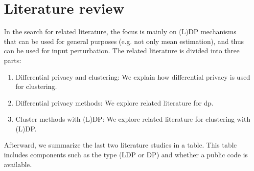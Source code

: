 \section{Literature review} \label{theory:literature-review}
In the search for related literature, the focus is mainly on (L)DP mechanisms that can be used for general purposes (e.g. not only mean estimation), and thus can be used for input perturbation.
The related literature is divided into three parts:
\begin{enumerate}
  \item Differential privacy and clustering: We explain how differential privacy is used for clustering.
  \item Differential privacy methods: We explore related literature for \gls{dp}.
  \item Cluster methods with (L)DP: We explore related literature for clustering with (L)DP.
\end{enumerate}
Afterward, we summarize the last two literature studies in a table.
This table includes components such as the type (LDP or DP) and whether a public code is available.

